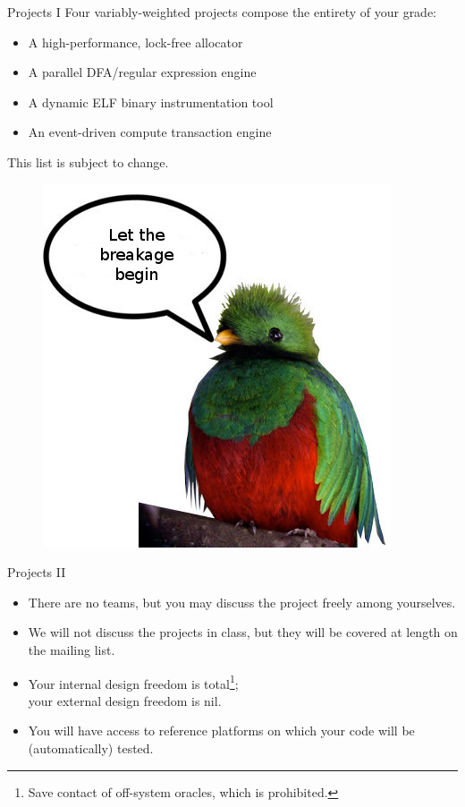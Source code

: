 \documentclass{beamer}
\begin{document}
\begin{frame}{Projects I}
Four variably-weighted projects compose the entirety of your grade:
\vspace{.25in}
\begin{itemize}
\item A high-performance, lock-free allocator
\item A parallel DFA/regular expression engine
\item A dynamic ELF binary instrumentation tool
\item An event-driven compute transaction engine
\end{itemize}
\vspace{.25in}
This list is subject to change.\\
\begin{figure}[b!]
\hfill \includegraphics[scale=0.33]{images/breakage.jpg}
\end{figure}
\end{frame}

\begin{frame}{Projects II}
\begin{itemize}
\item There are no teams, but you may discuss the project freely among
	yourselves.
\item We will not discuss the projects in class, but they will be
	covered at length on the mailing list.
\item Your internal design freedom is total\footnote{Save contact of off-system oracles, which is prohibited.};\\
your external design freedom is nil.
\item You will have access to reference platforms on which your code will be
	(automatically) tested.
\end{itemize}
\end{frame}
\end{document}
